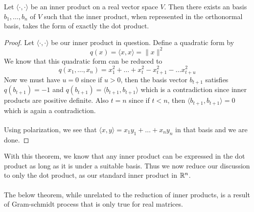 \documentclass[a4paper]{article}
\begin{document}
\begin{thm}{}{} Let $\langle \cdot,\cdot\rangle$ be an inner product on a real vector space $V$. Then there exists an basis $b_1,\dots,b_n$ of $V$ such that the inner product, when represented in the orthonormal basis, takes the form of exactly the dot product. \tcbline
\begin{proof}
Let $\langle \cdot,\cdot\rangle$ be our inner product in question. Define a quadratic form by $$q(x)=\langle x,x\rangle=\|x\|^2$$ We know that this quadratic form can be reduced to $$q(x_1,\dots,x_n)=x_1^2+\dots+x_t^2-x_{t+1}^2-\dots x_{t+u}^2$$ Now we must have $u=0$ since if $u>0$, then the basis vector $b_{t+1}$ satisfies $q(b_{t+1})=-1$ and $q(b_{t+1})=\langle b_{t+1},b_{t+1}\rangle$ which is a contradiction since inner products are positive definite. Also $t=n$ since if $t<n$, then $\langle b_{t+1},b_{t+1}\rangle=0$ which is again a contradiction. \\~\\
Using polarization, we see that $\langle x,y\rangle=x_1y_1+\dots+x_ny_n$ in that basis and we are done. 
\end{proof}
\end{thm}

With this theorem, we know that any inner product can be expressed in the dot product as long as it is under a suitable basis. Thus we now reduce our discussion to only the dot product, as our standard inner product in $\mathbb{R}^n$. \\~\\
The below theorem, while unrelated to the reduction of inner products, is a result of Gram-schmidt process that is only true for real matrices. 
\end{document}
